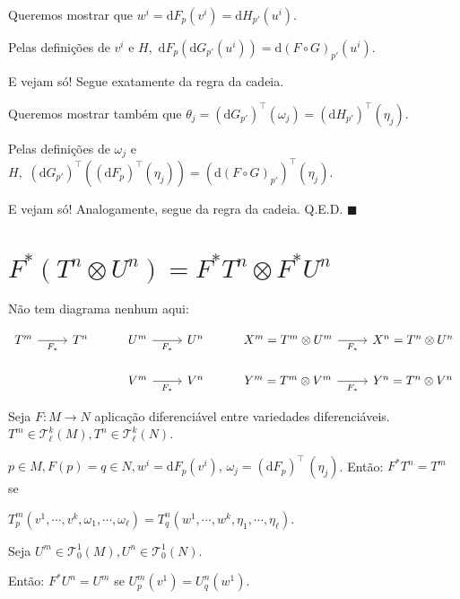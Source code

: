 \documentclass[12pt]{article}
\begin{document}
		Queremos mostrar que $w^i = \mathrm{d}F_p(v^i) = \mathrm{d}H_{p'} (u^i)$.

		Pelas defini\c{c}\~oes de $v^i$ e $H,\,\,\mathrm{d}F_p(\mathrm{d}G_{p'} (u^i)) = \mathrm{d}(F \circ G)_{p'} (u^i)$.

		E vejam s\'o! Segue exatamente da regra da cadeia.

		Queremos mostrar tamb\'em que $\theta_j = (\mathrm{d}G_{p'})^\top (\omega_j) = (\mathrm{d}H_{p'})^\top (\eta_j)$.

		Pelas defini\c{c}\~oes de $\omega_j$ e $H,\,\,(\mathrm{d}G_{p'})^\top ((\mathrm{d}F_p)^\top (\eta_j)) = (\mathrm{d}(F \circ G)_{p'})^\top (\eta_j)$.

		E vejam s\'o! Analogamente, segue da regra da cadeia. Q.E.D.$\,\,\blacksquare$

	\section{$F^* (T^n \otimes U^n) = F^* T^n \otimes F^* U^n$}
		\begin{flushright}
		\end{flushright}

		N\~ao tem diagrama nenhum aqui:

		\[
		\begin{tikzcd}
		T^m \arrow[swap]{r}{F_*} & T^n & U^m \arrow[swap]{r}{F_*} & U^n & X^m = T^m \otimes U^m \arrow[swap]{r}{F_*} & X^n = T^n \otimes U^n \\
		                                          &         & V^m \arrow[swap]{r}{F_*} & V^n & Y^m = T^m \otimes V^m \arrow[swap]{r}{F_*} & Y^n = T^n \otimes V^n
		\end{tikzcd}
		\]

		Seja $F: M \rightarrow N$ aplica\c{c}\~ao diferenci\'avel entre variedades diferenci\'aveis.  $T^m \in \mathcal{T}^k_\ell(M), T^n \in \mathcal{T}^k_\ell(N)$.

		$p \in M, F(p) = q \in N, w^i = \mathrm{d}F_p (v^i),\,\omega_j = (\mathrm{d}F_p)^\top\,(\eta_j)$. Ent\~ao: $F^* T^n = T^m$ se

		$T^m_p (v^1, \cdots, v^k, \omega_1, \cdots, \omega_\ell) = T_q^n (w^1, \cdots, w^k, \eta_1, \cdots, \eta_\ell)$.

		\vspace{3mm}

		Seja $U^m \in \mathcal{T}^1_0(M), U^n \in \mathcal{T}^1_0(N)$.

		Ent\~ao: $F^* U^n = U^m$ se $U^m_p (v^1) = U_q^n (w^1)$.
\end{document}

